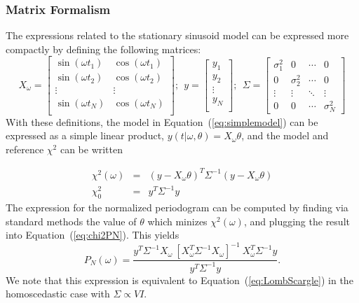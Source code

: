\documentclass[12pt,preprint]{aastex}
\newcommand{\Eq}[1]{Equation~(\ref{eq:#1})}
\newcommand{\eq}[1]{\Eq{#1}}
\newcommand{\eqlabel}[1]{\label{eq:#1}}
\begin{document}
\subsubsection{Matrix Formalism}
The expressions related to the stationary sinusoid model can be expressed more compactly by defining the following matrices:
\begin{equation}
X_\omega = \left[
\begin{array}{cc}
\sin(\omega t_1) & \cos(\omega t_1)\\
\sin(\omega t_2) & \cos(\omega t_2)\\
\vdots & \vdots \\
\sin(\omega t_N) & \cos(\omega t_N)\\
\end{array}
\right];~~
y = \left[
\begin{array}{c}
y_1 \\
y_2\\
\vdots \\
y_N\\
\end{array}
\right];~~
\Sigma = \left[
\begin{array}{cccc}
\sigma_1^2 & 0 &  \cdots & 0\\
0 & \sigma_2^2 &  \cdots & 0\\
\vdots & \vdots &  \ddots & \vdots\\
0 & 0 &  \cdots & \sigma_N^2
\end{array}
\right]
\end{equation}
With these definitions, the model in \eq{simplemodel} can be expressed as a simple linear product, $y(t|\omega,\theta) = X_\omega\theta$, and the model and reference $\chi^2$ can be written

\begin{eqnarray}
  \chi^2(\omega) &=& (y - X_\omega\theta)^T\Sigma^{-1}(y - X_\omega\theta)\\
  \chi^2_0 &=& y^T \Sigma^{-1} y
\end{eqnarray}
The expression for the normalized periodogram can be computed by finding via standard methods the value of $\theta$ which minizes $\chi^2(\omega)$, and plugging the result into \eq{chi2PN}. This yields
\begin{equation}
  \eqlabel{LombScargle2}
  P_N(\omega) = \frac{y^T\Sigma^{-1}X_\omega~[X_\omega^T\Sigma^{-1}X_\omega]^{-1}~X_\omega^T\Sigma^{-1}y}{y^T\Sigma^{-1}y}.
\end{equation}
We note that this expression is equivalent to \eq{LombScargle} in the homoscedastic case with $\Sigma \propto V I$.
\end{document}

